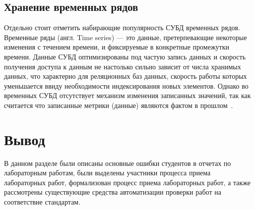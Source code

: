 \subsection{Хранение временных рядов}
Отдельно стоит отметить набирающие популярность СУБД временных рядов. Временные ряды (англ. Time series) --- это данные, 
претерпевающие некоторые изменения с течением 
времени, и фиксируемые в конкретные промежутки 
времени. Данные СУБД оптимизированы под частую запись данных и скорость получения доступа к данным не настолько сильно зависит от числа хранимых данных, что характерно для реляционных баз данных, скорость работы которых уменьшается ввиду необходимости индексирования новых элементов. Однако во временных СУБД отсутствует механизм изменения записанных значений, так как считается что записанные метрики (данные) являются фактом в прошлом~\cite{time_db}.

\section*{Вывод}
В данном разделе были описаны основные ошибки студентов в отчетах по лабораторным работам, были выделены участники процесса приема лабораторных работ, формализован процесс приема лабораторных работ, а также рассмотрены существующие средства автоматизации проверки работ на соответствие стандартам.

